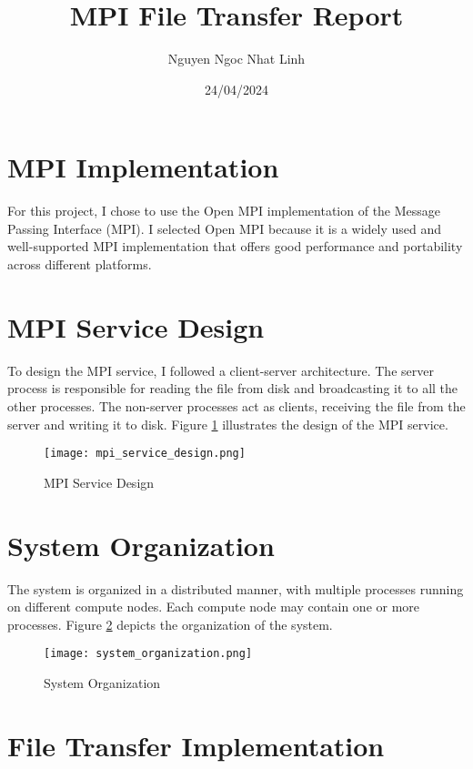 \documentclass{article}
\title{MPI File Transfer Report}
\author{Nguyen Ngoc Nhat Linh}
\date{24/04/2024}
\begin{document}
\maketitle

\section{MPI Implementation}

For this project, I chose to use the Open MPI implementation of the Message Passing Interface (MPI). I selected Open MPI because it is a widely used and well-supported MPI implementation that offers good performance and portability across different platforms.

\section{MPI Service Design}

To design the MPI service, I followed a client-server architecture. The server process is responsible for reading the file from disk and broadcasting it to all the other processes. The non-server processes act as clients, receiving the file from the server and writing it to disk. Figure \ref{fig:mpi_service} illustrates the design of the MPI service.

\begin{figure}[h]
  \centering
  \texttt{[image: mpi\_service\_design.png]}
  \caption{MPI Service Design}
  \label{fig:mpi_service}
\end{figure}

\section{System Organization}

The system is organized in a distributed manner, with multiple processes running on different compute nodes. Each compute node may contain one or more processes. Figure \ref{fig:system_organization} depicts the organization of the system.

\begin{figure}[h]
  \centering
  \texttt{[image: system\_organization.png]}
  \caption{System Organization}
  \label{fig:system_organization}
\end{figure}

\section{File Transfer Implementation}
\end{document}
